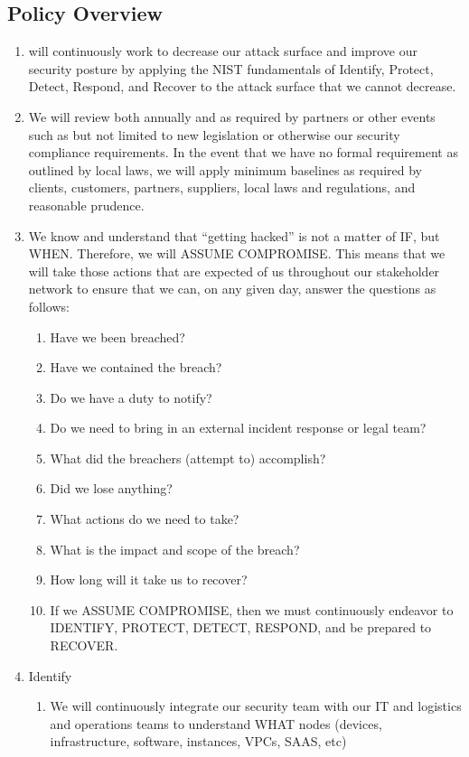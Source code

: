 \documentclass[../main.tex]{subfiles}
\begin{document}
\subsection{Policy Overview}
\begin{enumerate}
    \item \CompanyName will continuously work to decrease our attack surface and improve our security posture by applying the NIST fundamentals of
    Identify, Protect, Detect, Respond, and Recover to the attack surface that we cannot decrease.
    \item We will review both annually and as required by partners or other events such as but not limited to new legislation or otherwise our security compliance requirements.
    In the event that we have no formal requirement as outlined by local laws, we will apply minimum baselines as required by clients, customers, partners, suppliers, local laws and regulations,
    and reasonable prudence.
    \item We know and understand that “getting hacked” is not a matter of IF, but WHEN. Therefore, we will ASSUME COMPROMISE. This means that we will take those actions that are expected of us
    throughout our stakeholder network to ensure that we can, on any given day, answer the questions as follows:
    \begin{enumerate}
        \item Have we been breached?
        \item Have we contained the breach?
        \item Do we have a duty to notify?
        \item Do we need to bring in an external incident response or legal team?
        \item What did the breachers (attempt to) accomplish?
        \item Did we lose anything?
        \item What actions do we need to take?
        \item What is the impact and scope of the breach?
        \item How long will it take us to recover?
        \item If we ASSUME COMPROMISE, then we must continuously endeavor to IDENTIFY, PROTECT, DETECT, RESPOND, and be prepared to RECOVER.
    \end{enumerate}
    \item Identify
    \begin{enumerate}
        \item We will continuously integrate our security team with our IT and logistics and operations teams to understand WHAT nodes (devices, infrastructure, software, instances, VPCs, SAAS, etc)

\end{enumerate}
\end{enumerate}
\end{document}
